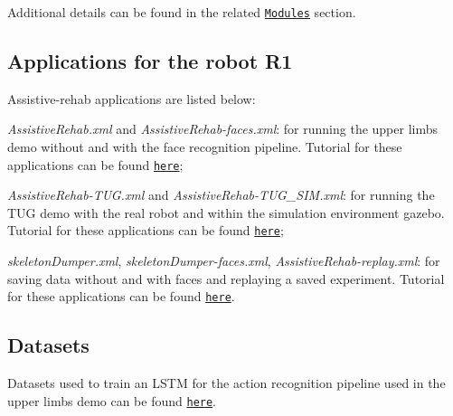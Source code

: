 Additional details can be found in the related \href{https://robotology.github.io/assistive-rehab/doc/doxygen/doc/html/modules.html}{\tt Modules} section.

\subsection*{Applications for the robot R1}

Assistive-\/rehab applications are listed below\+:


\begin{DoxyItemize}
\item {\itshape Assistive\+Rehab.\+xml} and {\itshape Assistive\+Rehab-\/faces.\+xml}\+: for running the upper limbs demo without and with the face recognition pipeline. Tutorial for these applications can be found \href{https://robotology.github.io/assistive-rehab/doc/mkdocs/site/main_apps/}{\tt here};
\item {\itshape Assistive\+Rehab-\/\+T\+U\+G.\+xml} and {\itshape Assistive\+Rehab-\/\+T\+U\+G\+\_\+\+S\+I\+M.\+xml}\+: for running the T\+UG demo with the real robot and within the simulation environment {\ttfamily gazebo}. Tutorial for these applications can be found \href{https://robotology.github.io/assistive-rehab/doc/mkdocs/site/tug_sim_demo/}{\tt here};
\item {\itshape skeleton\+Dumper.\+xml}, {\itshape skeleton\+Dumper-\/faces.\+xml}, {\itshape Assistive\+Rehab-\/replay.\+xml}\+: for saving data without and with faces and replaying a saved experiment. Tutorial for these applications can be found \href{https://robotology.github.io/assistive-rehab/doc/mkdocs/site/replay_an_experiment/}{\tt here}.
\end{DoxyItemize}

\subsection*{Datasets}

Datasets used to train an L\+S\+TM for the action recognition pipeline used in the upper limbs demo can be found \href{https://github.com/robotology/assistive-rehab-storage}{\tt here}. 